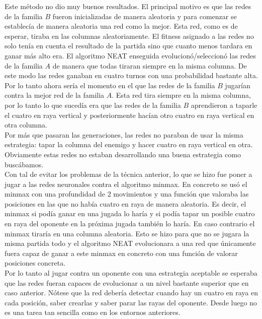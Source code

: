 \documentclass{article}
\begin{document}
Este método no dio muy buenos resultados. El principal motivo es que las redes de la familia $B$ fueron inicializadas de manera aleatoria y para comenzar se establecía de manera aleatoria una red como la mejor. Esta red, como es de esperar, tiraba en las columnas aleatoriamente. El fitness asignado a las redes no solo tenía en cuenta el resultado de la partida sino que cuanto menos tardara en ganar más alto era. El algoritmo NEAT enseguida evolucionó/seleccionó las redes de la familia $A$ de manera que todas tiraran siempre en la misma columna. De este modo las redes ganaban en cuatro turnos con una probabilidad bastante alta.\\

Por lo tanto ahora sería el momento en el que las redes de la familia $B$ jugarían contra la mejor red de la familia $A$. Esta red tira siempre en la misma columna, por lo tanto lo que sucedía era que las redes de la familia $B$ aprendieron a taparle el cuatro en raya vertical y posteriormente hacían otro cuatro en raya vertical en otra columna.\\

Por más que pasaran las generaciones, las redes no paraban de usar la misma estrategia: tapar la columna del enemigo y hacer cuatro en raya vertical en otra. Obviamente estas redes no estaban desarrollando una buena estrategia como buscábamos.\\

Con tal de evitar los problemas de la técnica anterior, lo que se hizo fue poner a jugar a las redes neuronales contra el algoritmo minmax. En concreto se usó el minmax con una profundidad de 2 movimientos y una función que valoraba las posiciones en las que no había cuatro en raya de manera aleatoria. Es decir, el minmax si podía ganar en una jugada lo haría y si podía tapar un posible cuatro en raya del oponente en la próxima jugada también lo haría. En caso contrario el minmax tiraría en una columna aleatoria. Esto se hizo para que no se jugara la misma partida todo y el algoritmo NEAT evolucionara a una red que únicamente fuera capaz de ganar a este minmax en concreto con una función de valorar posiciones concreta.\\

Por lo tanto al jugar contra un oponente con una estrategia aceptable se esperaba que las redes fueran capaces de evolucionar a un nivel bastante superior que en caso anterior. Nótese que la red debería detectar cuando hay un cuatro en raya en cada posición, saber crearlas y saber parar las rayas del oponente. Desde luego no es una tarea tan sencilla como en los entornos anteriores.\\
\end{document}

